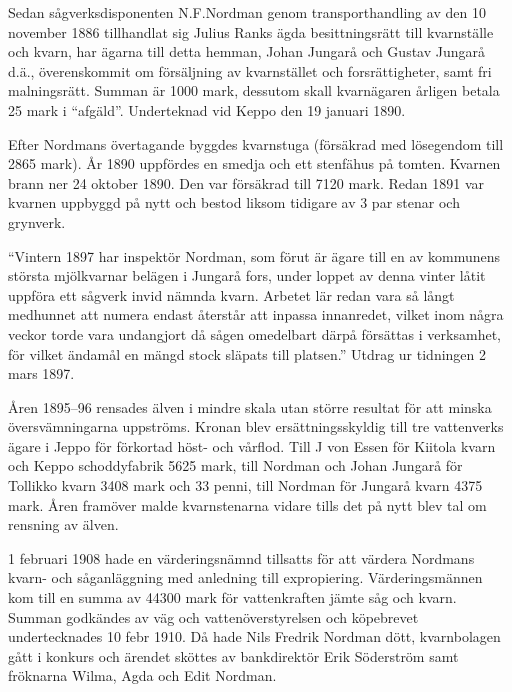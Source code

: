 Sedan sågverksdisponenten N.F.Nordman genom transporthandling av den 10 november 1886 tillhandlat sig Julius Ranks ägda besittningsrätt till kvarnställe och kvarn, har ägarna till detta hemman, Johan Jungarå och Gustav Jungarå d.ä., överenskommit om försäljning av kvarnstället och forsrättigheter, samt fri malningsrätt. Summan är 1000 mark, dessutom skall kvarnägaren årligen betala 25 mark i ``afgäld''. Underteknad vid Keppo den 19 januari 1890.

Efter Nordmans övertagande byggdes kvarnstuga (försäkrad med lösegendom till 2865 mark). År 1890 uppfördes en smedja och ett stenfähus på tomten. Kvarnen brann ner 24 oktober 1890. Den var försäkrad till 7120 mark. Redan 1891 var kvarnen uppbyggd på nytt och bestod liksom tidigare av 3 par stenar och grynverk.

``Vintern 1897 har inspektör Nordman, som förut är ägare till en av kommunens största mjölkvarnar belägen i Jungarå fors, under loppet av denna vinter låtit uppföra ett sågverk invid nämnda kvarn. Arbetet lär redan vara så långt medhunnet att numera endast återstår att inpassa innanredet, vilket inom några veckor torde vara undangjort	då sågen omedelbart därpå försättas i verksamhet, för vilket ändamål en mängd stock släpats till platsen.'' Utdrag ur tidningen 2 mars 1897.

Åren 1895--96 rensades älven i mindre skala utan större resultat för att minska översvämningarna uppströms. Kronan blev ersättningsskyldig till tre vattenverks ägare i Jeppo för förkortad höst- och vårflod. Till J von Essen för Kiitola kvarn och Keppo schoddyfabrik 5625 mark, till Nordman och Johan Jungarå för Tollikko kvarn 3408 mark och 33 penni, till Nordman för Jungarå kvarn 4375 mark. Åren framöver malde kvarnstenarna vidare tills det på nytt blev tal om rensning av älven.


1 februari 1908 hade en värderingsnämnd tillsatts för att värdera Nordmans kvarn- och såganläggning med anledning till expropiering. Värderingsmännen kom till en summa av 44300 mark för vattenkraften jämte såg och kvarn. Summan godkändes av väg och vattenöverstyrelsen och köpebrevet undertecknades 10 febr 1910. Då hade Nils Fredrik Nordman dött, kvarnbolagen gått i konkurs och ärendet sköttes av bankdirektör Erik Söderström samt fröknarna Wilma, Agda och Edit Nordman.

